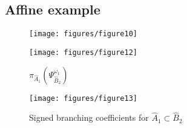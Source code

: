 \documentclass[pdftex]{beamer}
\theoremstyle{definition} \newtheorem{Def}{Definition}
\begin{document}
\subsection{Affine example}
\begin{frame}
  \begin{figure}[t]
    \vspace*{-0.5cm}
    \begin{multicols}{2}
      \hfill
      \texttt{[image: figures/figure10]}
      \hfill
      \caption{$\Gamma_{\hat A_1\subset \hat B_2}$}
      \hfill
      \texttt{[image: figures/figure12]}
      \caption{ $\pi_{\hat A_{1}}\left( \Psi ^{\omega_1  }_{\hat B_{2}}\right)$}
    \end{multicols}
  \end{figure}
  \begin{figure}[b]
    \vspace*{-1.3cm}
    \centering
      \texttt{[image: figures/figure13]}
    \caption{Signed branching coefficients for $\hat A_1\subset \hat B_2$}
    \label{fig:2}
  \end{figure}
\end{frame}
\end{document}
